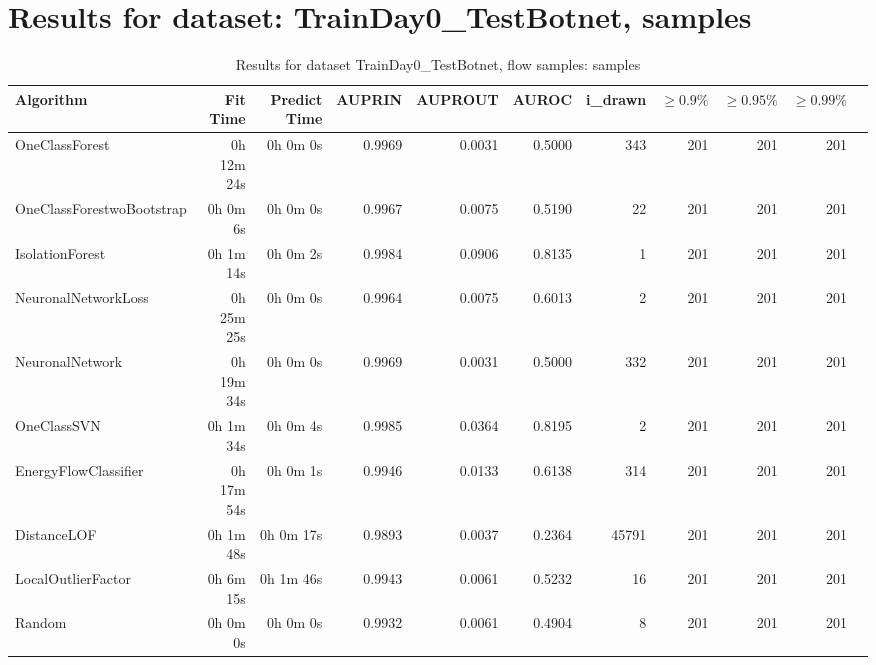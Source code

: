 \documentclass{article}
\begin{document}
\section*{Results for dataset: TrainDay0_TestBotnet, samples}
\begin{table}[h!]
\centering
\caption{Results for dataset TrainDay0_TestBotnet, flow samples: samples}
\begin{tabular}{lrrrrrrrrrr}
\toprule
Algorithm & Fit Time & Predict Time & AUPRIN & AUPROUT & AUROC & i\_drawn & $\geq 0.9\%$ & $\geq 0.95\%$ & $\geq 0.99\%$ \\
\midrule
OneClassForest & 0h 12m 24s & 0h 0m 0s & 0.9969 & 0.0031 & 0.5000 & 343 & 201 & 201 & 201 \\
OneClassForestwoBootstrap & 0h 0m 6s & 0h 0m 0s & 0.9967 & 0.0075 & 0.5190 & 22 & 201 & 201 & 201 \\
IsolationForest & 0h 1m 14s & 0h 0m 2s & 0.9984 & 0.0906 & 0.8135 & 1 & 201 & 201 & 201 \\
NeuronalNetworkLoss & 0h 25m 25s & 0h 0m 0s & 0.9964 & 0.0075 & 0.6013 & 2 & 201 & 201 & 201 \\
NeuronalNetwork & 0h 19m 34s & 0h 0m 0s & 0.9969 & 0.0031 & 0.5000 & 332 & 201 & 201 & 201 \\
OneClassSVN & 0h 1m 34s & 0h 0m 4s & 0.9985 & 0.0364 & 0.8195 & 2 & 201 & 201 & 201 \\
EnergyFlowClassifier & 0h 17m 54s & 0h 0m 1s & 0.9946 & 0.0133 & 0.6138 & 314 & 201 & 201 & 201 \\
DistanceLOF & 0h 1m 48s & 0h 0m 17s & 0.9893 & 0.0037 & 0.2364 & 45791 & 201 & 201 & 201 \\
LocalOutlierFactor & 0h 6m 15s & 0h 1m 46s & 0.9943 & 0.0061 & 0.5232 & 16 & 201 & 201 & 201 \\
Random & 0h 0m 0s & 0h 0m 0s & 0.9932 & 0.0061 & 0.4904 & 8 & 201 & 201 & 201 \\
\bottomrule
\end{tabular}
\end{table}
\end{document}
